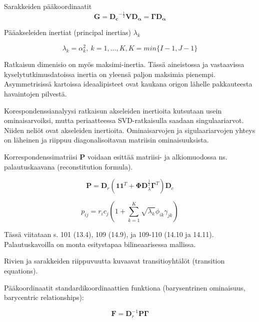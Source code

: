 \documentclass[
  finnish,
]{book}
\begin{document}
Sarakkeiden pääkoordinaatit
\begin{equation}
 \boldsymbol{G}  = \boldsymbol{D_c}^{-\frac{1}{2}} \boldsymbol{V} \boldsymbol{D_{\alpha}} = \boldsymbol{\Gamma}  \boldsymbol{D_{\alpha}}
 \label{eq:sarakeprinc1}
\end{equation}

Pääakseleiden inertiat (principal inertias) \(\lambda_{k}\)

\begin{equation}
\lambda_{k} = \alpha_{k}^2, \: k = 1,\dots,K,
K = min \{ I-1, J-1 \}
\end{equation}

Ratkaisun dimenisio on myös maksimi-inertia. Tässä aineistossa ja vastaavissa
kyselytutkimusdatoissa inertia on yleensä paljon maksimia pienempi. Asymmetrisissä
kartoissa ideaalipisteet ovat kaukana origon lähelle pakkauteesta havaintojen
pilvestä.

Korespondenssianalyysi ratkaisun akseleiden inertioita kutsutaan usein ominaisarvoiksi,
mutta periaatteessa SVD-ratkaisulla saadaan singulaariarvot. Niiden neliöt ovat
akseleiden inertioita. Ominaisarvojen ja sigulaariarvojen yhteys on läheinen ja
riippuu diagonalisoitavan matriisin ominaisuuksista.

Korrespondenssimatriisi \(\boldsymbol{P}\) voidaan esittää matriisi- ja
alkiomuodossa ns. palautuskaavana (reconstitution formula).

\begin{equation}
\boldsymbol{P} = \boldsymbol{D}_{r} \left( \boldsymbol{1}\boldsymbol{1}^{T} + \boldsymbol{\Phi}\boldsymbol{D}_{\lambda}^{\frac {1}{2}}\boldsymbol{\Gamma}^{T}\right)\boldsymbol{D}_{c}
\label{eq:reconstform1}
\end{equation}

\begin{equation}
p_ {ij}= r_{i}c_{j} \left(1 + \sum_{k=1}^{K} \sqrt{\lambda_{k}} \phi_{ik} \gamma_{jk} \right)
\label{eq:reconstform2}
\end{equation}

Tässä viitataan s. 101 (13.4), 109 (14.9), ja 109-110 (14.10 ja 14.11).
Palautuskavoilla on monta esitystapaa bilineaarisessa mallissa.

Rivien ja sarakkeiden riippuvuutta kuvaavat transitioyhtälöt (transition equations).

Pääkoordinaatit standardikoordinaattien funktiona (barysentrinen ominaisuus,
barycentric relationships):

\begin{equation}
\boldsymbol{F} = \boldsymbol{D}_{r}^{-1} \boldsymbol{P}\boldsymbol{\Gamma}
\label{eq:barysentr1}
\end{equation}
\end{document}
